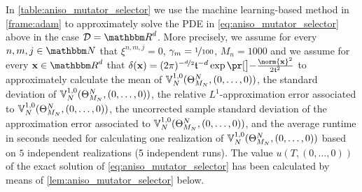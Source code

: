 In \cref{table:aniso_mutator_selector} 
we use the machine learning-based method
in \cref{frame:adam} to approximately solve the PDE in
\cref{eq:aniso_mutator_selector} above in the case
$\mathcal D=\R^d$.
More precisely, we 
assume for every
	$n,m,j\in\N$
that
	$\xi^{n,m,j}=0$,
	$\gamma_m = \nicefrac{1}{100}$,
	$M_n=1000$
and we assume for every
	$\mathbf x\in\R^d$
that
	$\delta(\mathbf x)=(2\pi)^{-\nicefrac d2}\mathfrak t^{-d}\exp\bpr{-\tfrac{\norm{\mathbf x}^2}{2\mathfrak t^2}}$
to approximately calculate
the mean of %
$
{\mathbb{V}}^{1,0}_N(\Theta^N_{M_N},\allowbreak (0,\ldots,0))
$,
the standard deviation of %
$
{\mathbb{V}}^{1,0}_N(\Theta^N_{M_N},\allowbreak (0,\ldots,0))
$,
the relative $ L^1 $-approximation error associated to %
$
{\mathbb{V}}^{1,0}_N(\Theta^N_{M_N},\allowbreak (0,\ldots,\allowbreak 0))
$,
the uncorrected sample standard deviation of the approximation error associated to %
$
{\mathbb{V}}^{1,0}_N(\Theta^N_{M_N},\allowbreak (0,\ldots,0))
$,
and the average runtime in seconds needed for calculating one realization of $
{\mathbb{V}}^{1,0}_N(\Theta^N_{M_N},\allowbreak (0,\ldots,0))
$
%
based on $5$ independent realizations (5 independent runs).
%
The value $u(T,(0,\ldots,0))$ of the exact solution of \eqref{eq:aniso_mutator_selector} has been calculated by means of \cref{lem:aniso_mutator_selector} below.

